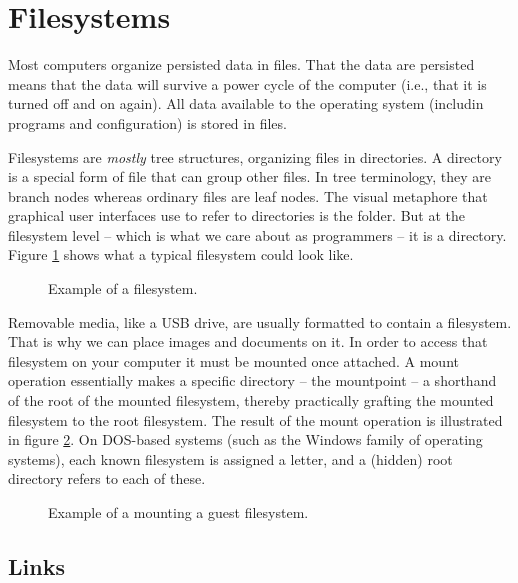 \section{Filesystems}

Most computers organize persisted data in files. That the data are persisted means that the data will survive a power cycle of the computer (i.e., that it is turned off and on again). All data available to the operating system (includin programs and configuration) is stored in files.

Filesystems are \textsl{mostly} tree structures, organizing files in directories. A directory is a special form of file that can group other files. In tree terminology, they are branch nodes whereas ordinary files are leaf nodes. The visual metaphore that graphical user interfaces use to refer to directories is the folder. But at the filesystem level -- which is what we care about as programmers -- it is a directory. Figure \ref{fig:bs:fs} shows what a typical filesystem could look like.

\begin{figure}[tbp]
  
  \caption{Example of a filesystem.}
  \label{fig:bs:fs}
\end{figure}

Removable media, like a USB drive, are usually formatted to contain a filesystem. That is why we can place images and documents on it. In order to access that filesystem on your computer it must be mounted once attached. A mount operation essentially makes a specific directory -- the mountpoint -- a shorthand of the root of the mounted filesystem, thereby practically grafting the mounted filesystem to the root filesystem. The result of the mount operation is illustrated in figure \ref{fig:bs:fs:mounting}. On DOS-based systems (such as the Windows family of operating systems),
each known filesystem is assigned a letter, and a (hidden) root directory refers
to each of these.

\begin{figure}[tbp]
  
  \caption{Example of a mounting a guest filesystem.}
  \label{fig:bs:fs:mounting}
\end{figure}

\subsection{Links}

